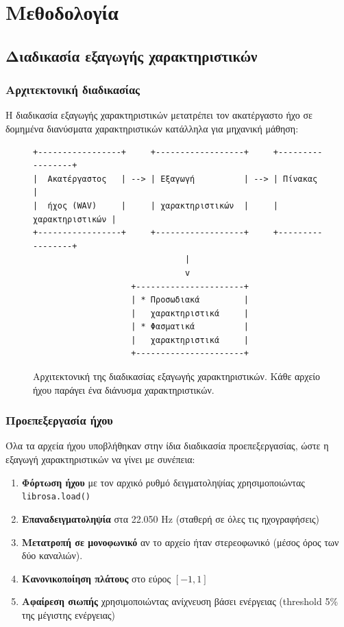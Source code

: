 
\chapter{Μεθοδολογία}
\label{ch:methodology}

\section{Διαδικασία εξαγωγής χαρακτηριστικών}

\subsection{Αρχιτεκτονική διαδικασίας}

Η διαδικασία εξαγωγής χαρακτηριστικών μετατρέπει τον ακατέργαστο ήχο σε δομημένα διανύσματα χαρακτηριστικών κατάλληλα για μηχανική μάθηση:

\begin{figure}[H]
\centering
\begin{verbatim}
+-----------------+     +------------------+     +-----------------+
|  Ακατέργαστος   | --> | Εξαγωγή          | --> | Πίνακας         |
|  ήχος (WAV)     |     | χαρακτηριστικών  |     | χαρακτηριστικών |
+-----------------+     +------------------+     +-----------------+
                               |
                               v
                    +----------------------+
                    | * Προσωδιακά         |
                    |   χαρακτηριστικά     |
                    | * Φασματικά          |
                    |   χαρακτηριστικά     |
                    +----------------------+
\end{verbatim}
\caption{Αρχιτεκτονική της διαδικασίας εξαγωγής χαρακτηριστικών. Κάθε αρχείο ήχου παράγει ένα διάνυσμα χαρακτηριστικών.}
\label{fig:pipeline-architecture}
\end{figure}

\subsection{Προεπεξεργασία ήχου}

Όλα τα αρχεία ήχου υποβλήθηκαν στην ίδια διαδικασία προεπεξεργασίας, ώστε η εξαγωγή χαρακτηριστικών να γίνει με συνέπεια:

\begin{enumerate}
    \item \textbf{Φόρτωση ήχου} με τον αρχικό ρυθμό δειγματοληψίας χρησιμοποιώντας \texttt{librosa.load()}
    \item \textbf{Επαναδειγματοληψία} στα 22.050 Hz (σταθερή σε όλες τις ηχογραφήσεις)
    \item \textbf{Μετατροπή σε μονοφωνικό} αν το αρχείο ήταν στερεοφωνικό (μέσος όρος των δύο καναλιών).
    \item \textbf{Κανονικοποίηση πλάτους} στο εύρος $[-1, 1]$
    \item \textbf{Αφαίρεση σιωπής} χρησιμοποιώντας ανίχνευση βάσει ενέργειας (threshold 5\% της μέγιστης ενέργειας)
\end{enumerate}


